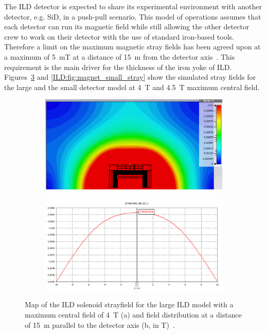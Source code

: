 The ILD detector is expected to share its experimental environment with another detector, e.g. SiD, in a push-pull scenario. This model of operations assumes that each detector can run its magnetic field while still allowing the other detector crew to work on their detector with the use of standard iron-based tools. Therefore a limit on the maximum magnetic stray fields has been agreed upon at a maximum of 5~mT at a distance of 15~m from the detector axis~\cite{Parker:2009zz}. This requirement is the main driver for the thickness of the iron yoke of ILD. Figures~\ref{ILD:fig:magnet_nominal_stray} and \ref{ILD:fig:magnet_small_stray} show the simulated stray fields for the large and the small detector model at 4~T and 4.5~T maximum central field.
\begin{figure}[t]
\begin{center}
\begin{subfigure}{0.9\hsize} \includegraphics[width=\textwidth]{Integration/fig/strayfield_nominal_4.png}
\caption{ \label{ild:fig:magnet_nominal_stray_map}}
 \end{subfigure}
\hspace{0.03\textwidth}
\begin{subfigure}{0.9\hsize} \includegraphics[width=\textwidth]{Integration/fig/strayfield_nominal_4_plot.png}
\caption{  \label{ild:fig:magnet_nominal_stray_field}}
 \end{subfigure}
\end{center}
\caption{Map of the ILD solenoid strayfield for the large ILD model with a maximum central field of 4~T (a) and field distribution at a distance of 15~m parallel to the detector axis (b, in T)~\cite{ild:bib:Magnet_Simulations}.}
\label{ILD:fig:magnet_nominal_stray}
\end{figure}


